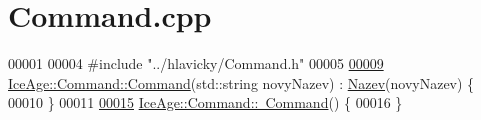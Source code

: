 \hypertarget{Command_8cpp_source}{}\section{Command.\+cpp}
\label{Command_8cpp_source}

\begin{DoxyCode}
00001 
00004 \textcolor{preprocessor}{#include "../hlavicky/Command.h"}
00005 
\hypertarget{Command_8cpp_source.tex_l00009}{}\hyperlink{classIceAge_1_1Command_a451edb7cb24df79568a193929293041d}{00009} \hyperlink{classIceAge_1_1Command_a451edb7cb24df79568a193929293041d}{IceAge::Command::Command}(std::string novyNazev) : \hyperlink{classIceAge_1_1Nazev}{Nazev}(novyNazev) \{
00010 \}
00011 
\hypertarget{Command_8cpp_source.tex_l00015}{}\hyperlink{classIceAge_1_1Command_a604f37ab9196a5a59a5b6e61aa1efc35}{00015} \hyperlink{classIceAge_1_1Command_a604f37ab9196a5a59a5b6e61aa1efc35}{IceAge::Command::~Command}() \{
00016 \}
\end{DoxyCode}
